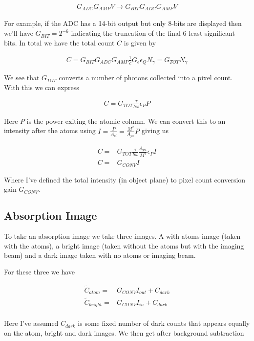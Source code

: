 \documentclass[12pt]{article}
\newcommand{\ep}{\epsilon}
\begin{document}
\begin{align}
G_{ADC}G_{AMP}V \rightarrow G_{BIT}G_{ADC}G_{AMP}V
\end{align}

For example, if the ADC has a 14-bit output but only 8-bits are displayed then we'll have $G_{BIT} = 2^{-6}$ indicating the truncation of the final 6 least significant bits.
In total we have the total count $C$ is given by

\begin{align}
C = G_{BIT}G_{ADC}G_{AMP}\frac{1}{c} G_e \ep_Q N_{\gamma} = G_{TOT} N_{\gamma}
\end{align}

We see that $G_{TOT}$ converts a number of photons collected into a pixel count.
With this we can express

\begin{align}
C =G_{TOT} \frac{\tau}{\hbar \omega} \ep_P P
\end{align}

Here $P$ is the power exiting the atomic column. 
We can convert this to an intensity after the atoms using $I = \frac{P}{A_{cl}} = \frac{M^2}{A_{px}} P$ giving us

\begin{align}
C =& G_{TOT} \frac{\tau}{\hbar \omega} \frac{A_{px}}{M^2} \ep_P I\\
C =& G_{CONV} I
\end{align}

Where I've defined the total intensity (in object plane) to pixel count conversion gain $G_{CONV}$.

\subsection{Absorption Image}

To take an absorption image we take three images.
A with atoms image (taken with the atoms), a bright image (taken without the atoms but with the imaging beam) and a dark image taken with no atoms or imaging beam.

For these three we have

\begin{align}
\tilde{C}_{atom} =& G_{CONV} I_{out} + C_{dark}\\
\tilde{C}_{bright} =& G_{CONV} I_{in} + C_{dark}\\
\end{align}

Here I've assumed $C_{dark}$ is some fixed number of dark counts that appears equally on the atom, bright and dark images.
We then get after background subtraction
\end{document}
